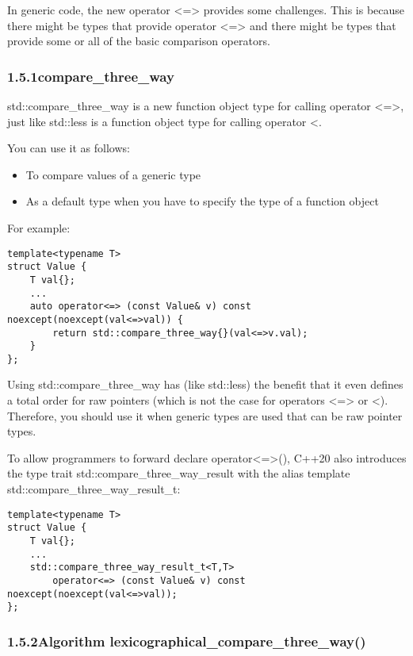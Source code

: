 
In generic code, the new operator <=> provides some challenges. This is because there might be types that provide operator <=> and there might be types that provide some or all of the basic comparison operators.

\subsubsection*{ 1.5.1\hspace{0.2cm}compare\_three\_way}

std::compare\_three\_way is a new function object type for calling operator <=>, just like std::less is a function object type for calling operator <.

You can use it as follows:

\begin{itemize}
\item
To compare values of a generic type

\item
As a default type when you have to specify the type of a function object
\end{itemize}

For example:

\begin{lstlisting}[style=styleCXX]
template<typename T>
struct Value {
	T val{};
	...
	auto operator<=> (const Value& v) const noexcept(noexcept(val<=>val)) {
		return std::compare_three_way{}(val<=>v.val);
	}
};
\end{lstlisting}

Using std::compare\_three\_way has (like std::less) the benefit that it even defines a total order for raw pointers (which is not the case for operators <=> or <). Therefore, you should use it when generic types are used that can be raw pointer types.

To allow programmers to forward declare operator<=>(), C++20 also introduces the type trait std::compare\_three\_way\_result with the alias template std::compare\_three\_way\_result\_t:

\begin{lstlisting}[style=styleCXX]
template<typename T>
struct Value {
	T val{};
	...
	std::compare_three_way_result_t<T,T>
		operator<=> (const Value& v) const noexcept(noexcept(val<=>val));
};
\end{lstlisting}

\subsubsection*{ 1.5.2\hspace{0.2cm}Algorithm lexicographical\_compare\_three\_way()}

